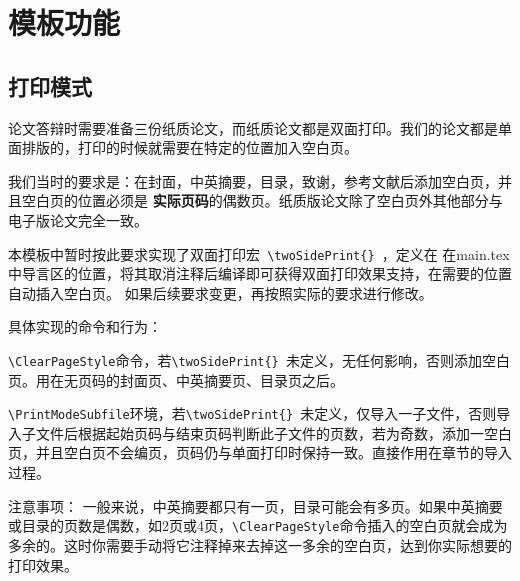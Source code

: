 \documentclass[supercite,fontset=windows]{../../upcthesis}
\begin{document}
\section{模板功能}
\subsection{打印模式}
论文答辩时需要准备三份纸质论文，而纸质论文都是双面打印。我们的论文都是单面排版的，打印的时候就需要在特定的位置加入空白页。

我们当时的要求是：在封面，中英摘要，目录，致谢，参考文献后添加空白页，并且空白页的位置必须是
\textbf{实际页码}的偶数页。纸质版论文除了空白页外其他部分与电子版论文完全一致。


本模板中暂时按此要求实现了双面打印宏\verb| \twoSidePrint{} |，定义在
在main.tex中导言区的位置，将其取消注释后编译即可获得双面打印效果支持，在需要的位置自动插入空白页。
如果后续要求变更，再按照实际的要求进行修改。

具体实现的命令和行为：

\verb|\ClearPageStyle|命令，若\verb|\twoSidePrint{} |未定义，无任何影响，否则添加空白页。用在无页码的封面页、中英摘要页、目录页之后。

\verb|\PrintModeSubfile|环境，若\verb|\twoSidePrint{} |未定义，仅导入一子文件，否则导入子文件后根据起始页码与结束页码判断此子文件的页数，若为奇数，添加一空白页，并且空白页不会编页，页码仍与单面打印时保持一致。直接作用在章节的导入过程。


注意事项：
一般来说，中英摘要都只有一页，目录可能会有多页。如果中英摘要或目录的页数是偶数，如2页或4页，\verb|\ClearPageStyle|命令插入的空白页就会成为多余的。这时你需要手动将它注释掉来去掉这一多余的空白页，达到你实际想要的打印效果。
\end{document}
